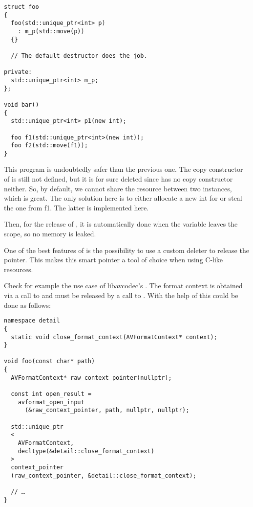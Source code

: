 \begin{lstlisting}
struct foo
{
  foo(std::unique_ptr<int> p)
    : m_p(std::move(p))
  {}

  // The default destructor does the job.

private:
  std::unique_ptr<int> m_p;
};

void bar()
{
  std::unique_ptr<int> p1(new int);

  foo f1(std::unique_ptr<int>(new int));
  foo f2(std::move(f1));
}
\end{lstlisting}

This program is undoubtedly safer than the previous one. The copy
constructor of  is still not defined, but it is for sure
deleted since  has no copy constructor
neither. So, by default, we cannot share the resource between two
instances, which is great. The only solution here is to either
allocate a new int for  or steal the one from {f1}. The
latter is implemented here.

Then, for the release of , it is automatically done when the
variable leaves the scope, so no memory is leaked.

\bigskip

One of the best features of  is the possibility
to use a custom deleter to release the pointer. This makes this smart
pointer a tool of choice when using C-like resources.

Check for example the use case of libavcodec's
. The format context is obtained via a call to
 and must be released by a call to
. With the help of
 this could be done as follows:

\begin{lstlisting}
namespace detail
{
  static void close_format_context(AVFormatContext* context);
}

void foo(const char* path)
{
  AVFormatContext* raw_context_pointer(nullptr);

  const int open_result =
    avformat_open_input
      (&raw_context_pointer, path, nullptr, nullptr);

  std::unique_ptr
  <
    AVFormatContext,
    decltype(&detail::close_format_context)
  >
  context_pointer
  (raw_context_pointer, &detail::close_format_context);

  // …
}
\end{lstlisting}

